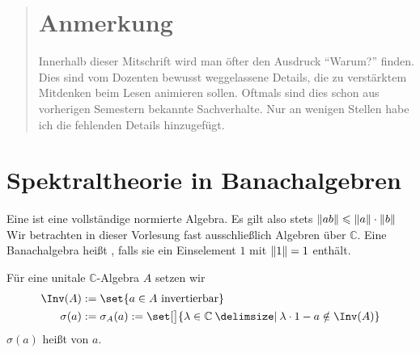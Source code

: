 
\newcommand{\fach}{Operatoralgebren}
\newcommand{\semester}{WiSe 2015}
\newcommand{\homepage}{https://wwwmath.uni-muenster.de/u/wilhelm.winter/wwinter/operatoralgebren.html}

\newcommand{\prof}{Prof.\ Dr.\ Wilhelm Winter}



\maketitle
\begin{abstract}

\section*{Anmerkung}
Innerhalb dieser Mitschrift wird man öfter den Ausdruck \enquote{Warum?} finden. Dies sind vom Dozenten bewusst weggelassene Details, die zu verstärktem Mitdenken beim Lesen 
animieren sollen. Oftmals sind dies schon aus vorherigen Semestern bekannte Sachverhalte. Nur an wenigen Stellen habe ich die fehlenden Details hinzugefügt.
\end{abstract}

\tableofcontents
\cleardoubleoddemptypage

\setcounter{page}{1}


\section{Spektraltheorie in Banachalgebren} %
\label{sec:1}

\begin{definition}[{name=[Banachalgebra]}]
	Eine  ist eine vollständige normierte Algebra. Es gilt also stets $\norm{a b} \le \norm{a} \cdot \norm{b}$
	Wir betrachten in dieser Vorlesung fast ausschließlich Algebren über $\mathds{C}$. Eine Banachalgebra heißt , falls sie ein Einselement $1$ mit $\norm{1} =1$ 
	enthält. 
\end{definition}

\begin{definition}[{name=[Menge der invertierbaren Elemente und Spektrum]}]
	Für eine unitale $\mathds{C}$-Algebra $A$ setzen wir 
	\begin{align}
		\Inv(A) &:= \set{a \in A  \text{ invertierbar} } \\
		\sigma(a) &:=\sigma_A(a) := \set[\big]{\lambda \in \mathds{C} \given \lambda \cdot 1 - a \notin \Inv(A)}
	\end{align}
	$\sigma(a)$ heißt  von $a$. 
\end{definition}

